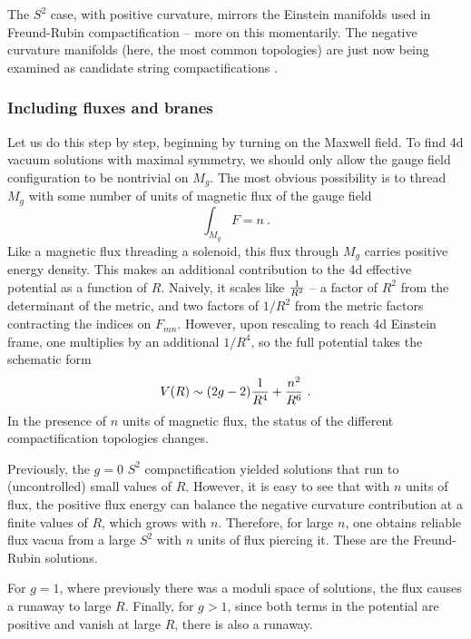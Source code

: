 \documentclass[aps,amsfonts]{ar2e}
\begin{document}
The $S^2$ case, with positive curvature, mirrors the Einstein
manifolds used in Freund-Rubin compactification \cite{Freund:1980xh}
-- more on this momentarily.  The negative curvature manifolds (here,
the most common topologies) are just now being examined as candidate
string compactifications \cite{McGreevy:2006hk}.

\subsubsection{Including fluxes and branes}

Let us do this step by step, beginning by turning on the Maxwell
field.  To find 4d vacuum solutions with maximal symmetry, we should
only allow the gauge field configuration to be  nontrivial on $M_g$.  The most
obvious possibility is to thread $M_g$ with some number of units of
magnetic flux of the gauge field
\begin{equation}
\int_{M_g} F = n~.
\end{equation}
Like a magnetic flux threading a solenoid, this flux through $M_g$
carries positive energy density.  This makes an additional
contribution to the 4d effective potential as a function of $R$.
Naively, it scales like ${1\over R^2}$ -- a factor of $R^2$ from the
determinant of the metric, and two factors of $1/R^2$ from the metric
factors contracting the indices on $F_{mn}$.  However, upon rescaling
to reach 4d Einstein frame, one multiplies by an additional $1/R^4$,
so the full potential takes the schematic form
\begin{equation}
\label{curvflux}
V(R) \sim (2g-2){1\over R^4} + {n^2\over R^6}~.
\end{equation}
In the presence of $n$ units of magnetic flux, the status of the different
compactification topologies changes.

Previously, the $g=0$ $S^2$ compactification yielded solutions that run to
(uncontrolled) small values of $R$.  However, it is easy to see that with
$n$ units of flux, the positive flux energy can balance the negative curvature
contribution at a finite values of $R$, which grows with $n$.  Therefore,
for large $n$, one obtains reliable flux vacua from a large $S^2$ with $n$
units of flux piercing it.  These are the Freund-Rubin solutions.

For $g=1$, where previously there was a moduli space of solutions,
the flux causes a runaway to large $R$.
Finally, for $g>1$, since both terms in the potential are positive and vanish
at large $R$, there is also a runaway.
\end{document}
